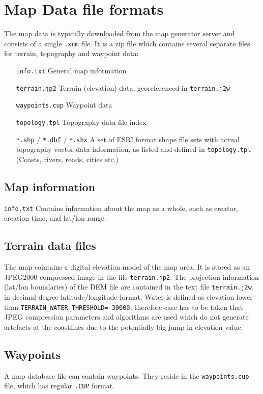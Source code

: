 \section{Map Data file formats}
The map data is typically downloaded from the map generator server and consists of a single \texttt{.xcm} file.
It is a zip file which contains several separate files for terrain, topography and waypoint data:
\begin{itemize}
\item[\texttt{info.txt}] General map information
\item[\texttt{terrain.jp2}] Terrain (elevation) data, georeferenced in \texttt{terrain.j2w}
\item[\texttt{waypoints.cup}] Waypoint data
\item[\texttt{topology.tpl}] Topography data file index
\item[\texttt{*.shp} / \texttt{*.dbf} / \texttt{*.shx}] A set of ESRI format shape file sets with actual topography voctor data information, as listed and defined in \texttt{topology.tpl} (Coasts, rivers, roads, cities etc.)
\end{itemize}
\subsection{Map information}
\texttt{info.txt}
Contains information about the map as a whole, such as creator, creation time, and lat/lon range.

\subsection{Terrain data files}
The map cointains a digital elevation model of the map area. It is stored as an JPEG2000 compressed image in the file \texttt{terrain.jp2}. The projection information (lat/lon boundaries) of the DEM file are contained in the text file \texttt{terrain.j2w}, in decimal degree latitude/longitude format.
Water is defined as elevation lower than \texttt{TERRAIN\_WATER\_THRESHOLD=-30000}, therefore care has to be taken that JPEG compression parameters and algorithms  are used which do not generate artefacts at the coastlines due to the potentially big jump in elevation value.
\subsection{Waypoints}
A map database file can contain waypoints. They reside in the \texttt{waypoints.cup} file, which has regular \texttt{.CUP} format.

